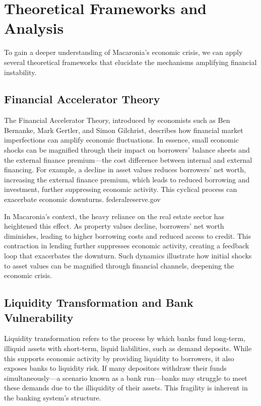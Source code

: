 \section{Theoretical Frameworks and Analysis}

To gain a deeper understanding of Macaronia's economic crisis, we can apply several theoretical frameworks that elucidate the mechanisms amplifying financial instability.

\subsection{Financial Accelerator Theory}

The Financial Accelerator Theory, introduced by economists such as Ben Bernanke, Mark Gertler, and Simon Gilchrist, describes how financial market imperfections can amplify economic fluctuations. In essence, small economic shocks can be magnified through their impact on borrowers' balance sheets and the external finance premium—the cost difference between internal and external financing. For example, a decline in asset values reduces borrowers' net worth, increasing the external finance premium, which leads to reduced borrowing and investment, further suppressing economic activity. This cyclical process can exacerbate economic downturns.
federalreserve.gov

In Macaronia's context, the heavy reliance on the real estate sector has heightened this effect. As property values decline, borrowers' net worth diminishes, leading to higher borrowing costs and reduced access to credit. This contraction in lending further suppresses economic activity, creating a feedback loop that exacerbates the downturn. Such dynamics illustrate how initial shocks to asset values can be magnified through financial channels, deepening the economic crisis.

\subsection{Liquidity Transformation and Bank Vulnerability}

Liquidity transformation refers to the process by which banks fund long-term, illiquid assets with short-term, liquid liabilities, such as demand deposits. While this supports economic activity by providing liquidity to borrowers, it also exposes banks to liquidity risk. If many depositors withdraw their funds simultaneously—a scenario known as a bank run—banks may struggle to meet these demands due to the illiquidity of their assets. This fragility is inherent in the banking system's structure.

